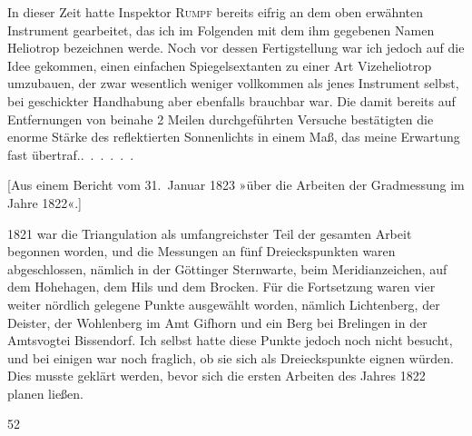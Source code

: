 \par\noindent\hspace*{\parindent}In dieser Zeit hatte Inspektor \textsc{Rumpf} bereits eifrig an dem oben
erwähnten Instrument gearbeitet, das ich im Folgenden mit dem ihm gegebenen
Namen Heliotrop bezeichnen werde. Noch vor dessen Fertigstellung war ich
jedoch auf die Idee gekommen, einen einfachen Spiegelsextanten zu einer
Art Vizeheliotrop umzubauen, der zwar wesentlich weniger vollkommen als
jenes Instrument selbst, bei geschickter Handhabung aber ebenfalls brauchbar
war. Die damit bereits auf Entfernungen von beinahe 2 Meilen durchgeführten
Versuche bestätigten die enorme Stärke des reflektierten Sonnenlichts in einem
Maß, das meine Erwartung fast \mbox{übertraf.\enspace\mbox{.\ .\ .\ .\ .\ .}}
\par\bigskip

\begin{center}
[Aus einem Bericht vom 31.~Januar 1823 »über die Arbeiten der Gradmessung im Jahre 1822«.]
\end{center}

\par\noindent\hspace*{\parindent}1821 war die Triangulation als umfangreichster Teil der gesamten Arbeit
begonnen worden, und die Messungen an fünf Dreieckspunkten waren abgeschlossen,
nämlich in der Göttinger Sternwarte, beim Meridianzeichen, auf dem Hohehagen,
dem Hils und dem Brocken. Für die Fortsetzung waren vier weiter nördlich
gelegene Punkte ausgewählt worden, nämlich Lichtenberg, der Deister, der
Wohlenberg im Amt Gifhorn und ein Berg bei Brelingen in der Amtsvogtei
Bissendorf. Ich selbst hatte diese Punkte jedoch noch nicht besucht, und bei
einigen war noch fraglich, ob sie sich als Dreieckspunkte eignen würden. Dies
musste geklärt werden, bevor sich die ersten Arbeiten des Jahres 1822 planen
ließen.

\par\smallskip
\noindent\hspace*{.030\linewidth}{\footnotesize IX.}\hfill{\small 52}\hspace*{.137\linewidth}\par
\clearpage

